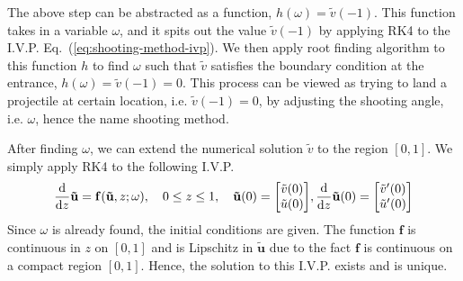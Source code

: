 The above step can be abstracted as a function, $h(\omega) = \tilde{v}(-1)$. This function takes in a variable $\omega$, and it spits out the value $\tilde{v}(-1)$ by applying RK4 to the I.V.P. Eq.~(\ref{eq:shooting-method-ivp}). We then apply root finding algorithm to this function $h$ to find $\omega$ such that $\tilde{v}$ satisfies the boundary condition at the entrance, $h(\omega)=\tilde{v}(-1)=0$. This process can be viewed as trying to land a projectile at certain location, i.e. $\tilde{v}(-1)=0$, by adjusting the shooting angle, i.e. $\omega$, hence the name shooting method.

After finding $\omega$, we can extend the numerical solution $\tilde{v}$ to the region $[0,1]$. We simply apply RK4 to the following I.V.P.
\begin{equation}
	\dv{z}\mathbf{\tilde{u}} = \mathbf{f}(\mathbf{\tilde{u}},z;\omega), \quad
	0 \leq z \leq 1, \quad
	\mathbf{\tilde{u}}(0)=\mqty[\tilde{v}(0) \\ \tilde{u}(0)], \dv{z}\mathbf{\tilde{u}}(0) =\mqty[\tilde{v}'(0) \\ \tilde{u}'(0)]
\end{equation}
Since $\omega$ is already found, the initial conditions are given. The function $\mathbf{f}$ is continuous in $z$ on $[0,1]$ and is Lipschitz in $\mathbf{\tilde{u}}$ due to the fact $\mathbf{f}$ is continuous on a compact region $[0,1]$. Hence, the solution to this I.V.P. exists and is unique.